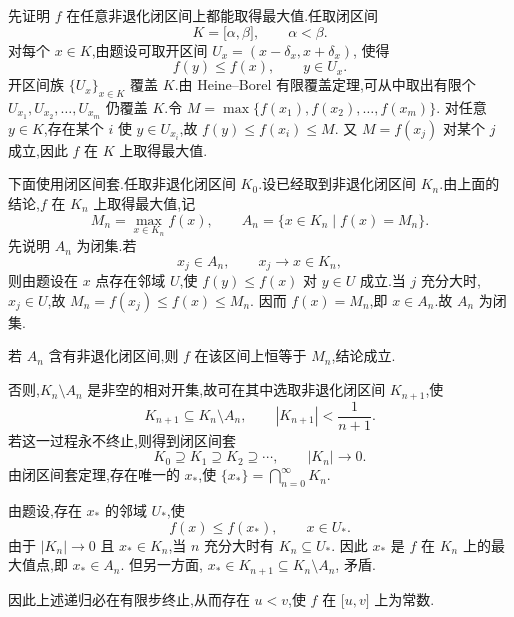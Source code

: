 \begin{solution}
    先证明 $f$ 在任意非退化闭区间上都能取得最大值.任取闭区间
    \[
        K=\lbrack\alpha,\beta\rbrack,
        \qquad
        \alpha<\beta.
    \]
    对每个 $x\in K$,由题设可取开区间 $U_x=(x-\delta_x,x+\delta_x)$, 使得
    \[
        f(y)\leq f(x),
        \qquad
        y\in U_x.
    \]
    开区间族 $\{U_x\}_{x\in K}$ 覆盖 $K$.由 Heine--Borel 有限覆盖定理,可从中取出有限个 $U_{x_1},U_{x_2},\ldots,U_{x_m}$
    仍覆盖 $K$.令 $M=\max\{f(x_1),f(x_2),\ldots,f(x_m)\}$.
    对任意 $y\in K$,存在某个 $i$ 使 $y\in U_{x_i}$,故 $f(y)\leq f(x_i)\leq M$.
    又 $M=f(x_j)$ 对某个 $j$ 成立,因此 $f$ 在 $K$ 上取得最大值.

    下面使用闭区间套.任取非退化闭区间 $K_0$.设已经取到非退化闭区间 $K_n$.由上面的结论,$f$ 在 $K_n$ 上取得最大值,记
    \[
        M_n=\max\limits_{x\in K_n}f(x),
        \qquad
        A_n=\{x\in K_n\mid f(x)=M_n\}.
    \]
    先说明 $A_n$ 为闭集.若
    \[
        x_j\in A_n,
        \qquad
        x_j\to x\in K_n,
    \]
    则由题设在 $x$ 点存在邻域 $U$,使 $f(y)\leq f(x)$ 对 $y\in U$ 成立.当 $j$ 充分大时,$x_j\in U$,故 $M_n=f(x_j)\leq
        f(x)\leq M_n$.
    因而 $f(x)=M_n$,即 $x\in A_n$.故 $A_n$ 为闭集.

    若 $A_n$ 含有非退化闭区间,则 $f$ 在该区间上恒等于 $M_n$,结论成立.

    否则,$K_n\setminus A_n$ 是非空的相对开集,故可在其中选取非退化闭区间 $K_{n+1}$,使
    \[
        K_{n+1}\subseteq K_n\setminus A_n,
        \qquad
        |K_{n+1}|<\dfrac{1}{n+1}.
    \]
    若这一过程永不终止,则得到闭区间套
    \[
        K_0\supseteq K_1\supseteq K_2\supseteq\cdots,
        \qquad
        |K_n|\longrightarrow0.
    \]
    由闭区间套定理,存在唯一的 $x_*$,使 $\{x_*\}=\bigcap\limits_{n=0}^{\infty}K_n$.

    由题设,存在 $x_*$ 的邻域 $U_*$,使
    \[
        f(x)\leq f(x_*),
        \qquad
        x\in U_*.
    \]
    由于 $|K_n|\to0$ 且 $x_*\in K_n$,当 $n$ 充分大时有 $K_n\subseteq U_*$. 因此 $x_*$ 是 $f$ 在 $K_n$ 上的最大值点,即
    $x_*\in A_n$. 但另一方面, $x_*\in K_{n+1}\subseteq K_n\setminus A_n$,
    矛盾.

    因此上述递归必在有限步终止,从而存在 $u<v$,使 $f$ 在 $\lbrack u,v\rbrack$ 上为常数.
\end{solution}
